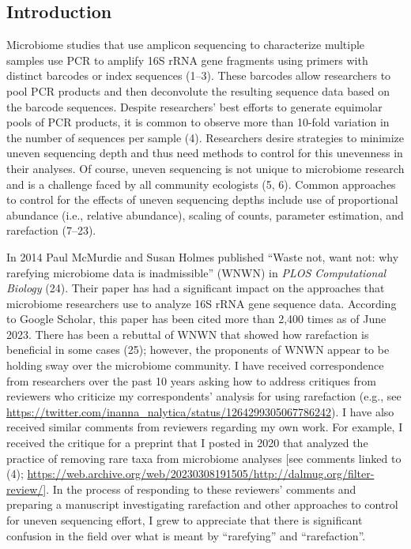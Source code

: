 \documentclass[
]{article}
\begin{document}
\newpage

\hypertarget{introduction}{%
\subsection{Introduction}\label{introduction}}

Microbiome studies that use amplicon sequencing to characterize multiple
samples use PCR to amplify 16S rRNA gene fragments using primers with
distinct barcodes or index sequences (1--3). These barcodes allow
researchers to pool PCR products and then deconvolute the resulting
sequence data based on the barcode sequences. Despite researchers' best
efforts to generate equimolar pools of PCR products, it is common to
observe more than 10-fold variation in the number of sequences per
sample (4). Researchers desire strategies to minimize uneven sequencing
depth and thus need methods to control for this unevenness in their
analyses. Of course, uneven sequencing is not unique to microbiome
research and is a challenge faced by all community ecologists (5, 6).
Common approaches to control for the effects of uneven sequencing depths
include use of proportional abundance (i.e., relative abundance),
scaling of counts, parameter estimation, and rarefaction (7--23).

In 2014 Paul McMurdie and Susan Holmes published ``Waste not, want not:
why rarefying microbiome data is inadmissible'' (WNWN) in \emph{PLOS
Computational Biology} (24). Their paper has had a significant impact on
the approaches that microbiome researchers use to analyze 16S rRNA gene
sequence data. According to Google Scholar, this paper has been cited
more than 2,400 times as of June 2023. There has been a rebuttal of WNWN
that showed how rarefaction is beneficial in some cases (25); however,
the proponents of WNWN appear to be holding sway over the microbiome
community. I have received correspondence from researchers over the past
10 years asking how to address critiques from reviewers who criticize my
correspondents' analysis for using rarefaction (e.g., see
\url{https://twitter.com/inanna_nalytica/status/1264299305067786242}). I
have also received similar comments from reviewers regarding my own
work. For example, I received the critique for a preprint that I posted
in 2020 that analyzed the practice of removing rare taxa from microbiome
analyses {[}see comments linked to (4);
\url{https://web.archive.org/web/20230308191505/http://dalmug.org/filter-review/}{]}.
In the process of responding to these reviewers' comments and preparing
a manuscript investigating rarefaction and other approaches to control
for uneven sequencing effort, I grew to appreciate that there is
significant confusion in the field over what is meant by ``rarefying''
and ``rarefaction''.
\end{document}
